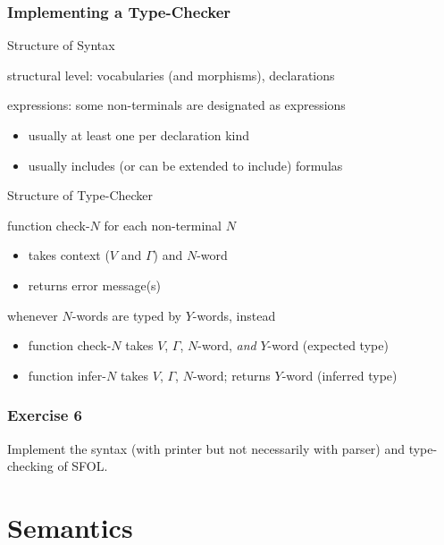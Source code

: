 \begin{frame}\frametitle{Implementing a Type-Checker}
\begin{blockitems}{Structure of Syntax}
\item structural level: vocabularies (and morphisms), declarations
\item expressions: some non-terminals are designated as expressions
 \begin{itemize}
 \item usually at least one per declaration kind
 \item usually includes (or can be extended to include) formulas
 \end{itemize}
\end{blockitems}

\begin{blockitems}{Structure of Type-Checker}
\item function check-$N$ for each non-terminal $N$
 \begin{itemize}
 \item takes context ($V$ and $\Gamma$) and $N$-word
 \item returns error message(s)
 \end{itemize}
\item whenever $N$-words are typed by $Y$-words, instead
 \begin{itemize}
 \item function check-$N$ takes $V$, $\Gamma$, $N$-word, \emph{and} $Y$-word (expected type)
 \item function infer-$N$ takes $V$, $\Gamma$, $N$-word; returns $Y$-word (inferred type)
 \end{itemize}
\end{blockitems}
\end{frame}

\begin{frame}\frametitle{Exercise 6}
Implement the syntax (with printer but not necessarily with parser) and type-checking of SFOL.
\end{frame}

\section{Semantics}

